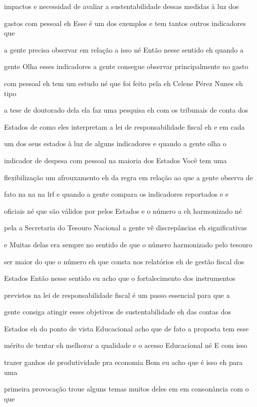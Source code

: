 \documentclass[a4paper,12pt]{article}
\begin{document}
impactos e necessidad de avaliar a sustentabilidade dessas medidas à luz dos

gastos com pessoal eh Esse é um dos exemplos e tem tantos outros indicadores que

a gente precisa observar em relação a isso né Então nesse sentido eh quando a

gente Olha esses indicadores a gente consegue observar principalmente no gasto

com pessoal eh tem um estudo né que foi feito pela eh Celene Pérez Nunes eh tipo

a tese de doutorado dela ela faz uma pesquisa eh com os tribunais de conta dos

Estados de como eles interpretam a lei de responsabilidade fiscal eh e em cada

um dos seus estados à luz de alguns indicadores e quando a gente olha o

indicador de despesa com pessoal na maioria dos Estados Você tem uma

flexibilização um afrouxamento eh da regra em relação ao que a gente observa de

fato na na na lrf e quando a gente compara os indicadores reportados e e

oficiais né que são válidos por pelos Estados e o número a eh harmonizado né

pela a Secretaria do Tesouro Nacional a gente vê discrepâncias eh significativas

e Muitas delas era sempre no sentido de que o número harmonizado pelo tesouro

ser maior do que o número eh que consta nos relatórios eh de gestão fiscal dos

Estados Então nesse sentido eu acho que o fortalecimento dos instrumentos

previstos na lei de responsabilidade fiscal é um passo essencial para que a

gente consiga atingir esses objetivos de sustentabilidade eh das contas dos

Estados eh do ponto de vista Educacional acho que de fato a proposta tem esse

mérito de tentar eh melhorar a qualidade e o acesso Educacional né E com isso

trazer ganhos de produtividade pra economia Bom eu acho que é isso eh para uma

primeira provocação troue alguns temas muitos deles em em consonância com o que
\end{document}

